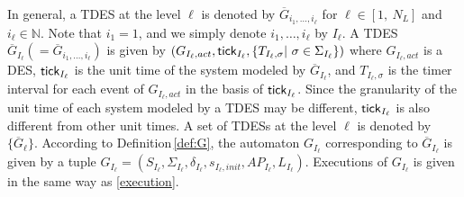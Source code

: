 \documentclass{article}
\newcommand{\rdef}[1]{Definition\,\ref{#1}}
\newcommand{\req}[1]{\eqref{#1}}
\newcommand{\tick}{{\sf tick}}
\newcommand{\AP}{{\textit AP}}
\begin{document}
In general, a TDES at the level $\ell$ is denoted by $\overline{G}_{i_1,\ldots,i_{\ell}}$ for $\ell\in[1,~N_L]$ and $i_\ell\in\mathbb{N}$.
Note that $i_1=1$, and we simply denote $i_1,\ldots,i_{\ell}$ by $I_{\ell}$.
A TDES $\overline{G}_{I_{\ell}}(=\overline{G}_{i_1,\ldots,i_{\ell}})$ is given by $({G}_{{I_{\ell}},act},\tick_{I_{\ell}},\{T_{{I_{\ell}},\sigma}|~\sigma\in\Sigma_{I_{\ell}}\})$ where $G_{{I_{\ell}},act}$ is a DES, $\tick_{I_{\ell}}$ is the unit time of the system modeled by $\overline{G}_{I_{\ell}}$, and $T_{{I_{\ell}},\sigma}$ is the timer interval for each event of $G_{{I_{\ell}},act}$ in the basis of $\tick_{I_{\ell}}$. %
Since the granularity of the unit time of each system modeled by a TDES may be different, $\tick_{I_\ell}$ is also different from other unit times. 
A set of TDESs at the level $\ell$ is denoted by $\{\overline{G}_{\ell}\}$. 
According to \rdef{def:G}, the automaton $G_{I_{\ell}}$ corresponding to $\overline{G}_{I_{\ell}}$ is given by a tuple $G_{I_{\ell}}=(S_{I_{\ell}},\Sigma_{I_{\ell}},\delta_{I_{\ell}},s_{{I_{\ell}},init},AP_{I_{\ell}},L_{I_{\ell}})$.
%
%
Executions of $G_{I_{\ell}}$ is given in the same way as \req{execution}.
\end{document}
